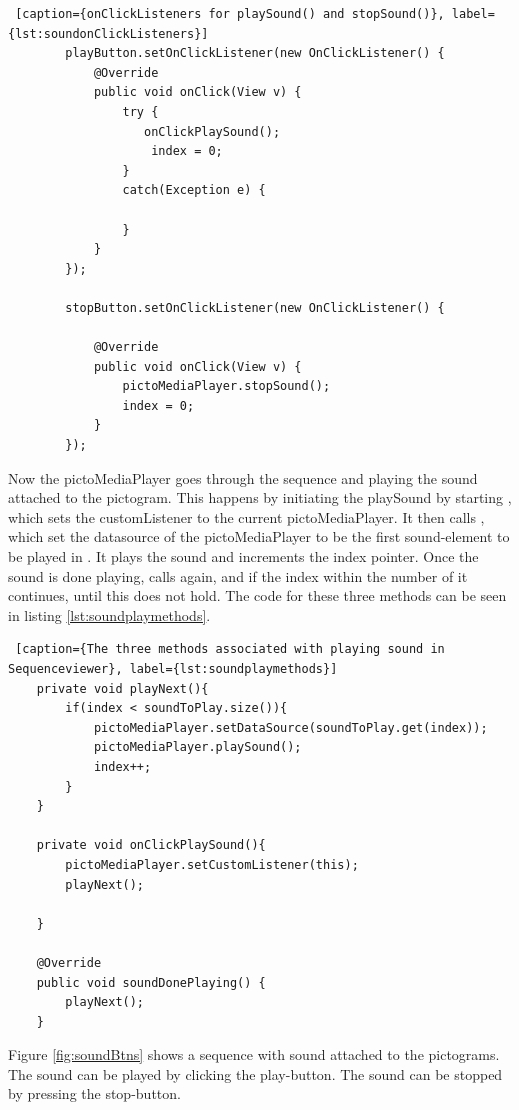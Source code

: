 \begin{lstlisting} [caption={onClickListeners for playSound() and stopSound()}, label={lst:soundonClickListeners}]
        playButton.setOnClickListener(new OnClickListener() {
            @Override
            public void onClick(View v) {
                try {
                   onClickPlaySound();
                    index = 0;
                }
                catch(Exception e) {

                }
            }
        });

        stopButton.setOnClickListener(new OnClickListener() {

            @Override
            public void onClick(View v) {
                pictoMediaPlayer.stopSound();
                index = 0;
            }
        });
\end{lstlisting}

Now the pictoMediaPlayer goes through the sequence and playing the sound attached to the pictogram. This happens by initiating the playSound by starting , which sets the customListener to the current pictoMediaPlayer. It then calls , which set the datasource of the pictoMediaPlayer to be the first sound-element to be played in . It plays the sound and increments the index pointer. Once the sound is done playing,  calls  again, and if the index within the number of  it continues, until this does not hold. The code for these three methods can be seen in listing \ref{lst:soundplaymethods}.

\begin{lstlisting} [caption={The three methods associated with playing sound in Sequenceviewer}, label={lst:soundplaymethods}]
    private void playNext(){
        if(index < soundToPlay.size()){
            pictoMediaPlayer.setDataSource(soundToPlay.get(index));
            pictoMediaPlayer.playSound();
            index++;
        }
    }

    private void onClickPlaySound(){
        pictoMediaPlayer.setCustomListener(this);
        playNext();

    }

    @Override
    public void soundDonePlaying() {
        playNext();
    }
\end{lstlisting}

Figure \ref{fig:soundBtns} shows a sequence with sound attached to the pictograms. The sound can be played by clicking the play-button. The sound can be stopped by pressing the stop-button.

